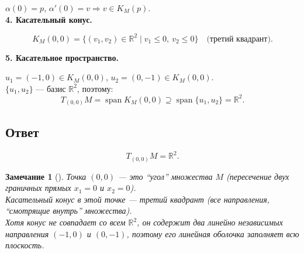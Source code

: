 \documentclass[12pt]{article}
\newtheorem{remark}{Замечание}
\begin{document}
$\alpha(0) = p$, $\alpha'(0) = v \Rightarrow v \in K_M(p)$.\\

\textbf{4. Касательный конус.}

\[
K_M(0,0) = \{(v_1, v_2) \in \mathbb{R}^2 \mid v_1 \le 0,\ v_2 \le 0\} \quad \text{(третий квадрант)}.
\]

\textbf{5. Касательное пространство.\\}

$u_1 = (-1, 0) \in K_M(0,0)$, $u_2 = (0, -1) \in K_M(0,0)$.\\

$\{u_1, u_2\}$ --- базис $\mathbb{R}^2$, поэтому:
\[
T_{(0,0)}M = \operatorname{span} K_M(0,0) \supseteq \operatorname{span}\{u_1, u_2\} = \mathbb{R}^2.
\]

\subsection*{Ответ}

\[
\boxed{T_{(0,0)}M = \mathbb{R}^2.}
\]

\begin{remark}[]
Точка $(0,0)$ --- это ``угол'' множества $M$ (пересечение двух граничных прямых $x_1 = 0$ и $x_2 = 0$).\\

Касательный конус в этой точке --- третий квадрант (все направления, ``смотрящие внутрь'' множества).\\

Хотя конус не совпадает со всем $\mathbb{R}^2$, он содержит два линейно независимых направления $(-1,0)$ и $(0,-1)$, поэтому его линейная оболочка заполняет всю плоскость.
\end{remark}
\end{document}
